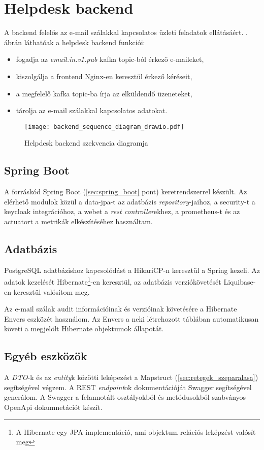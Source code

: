 \section{Helpdesk backend}
A backend felelős az e-mail szálakkal kapcsolatos üzleti feladatok ellátásáért. . ábrán láthatóak a helpdesk backend funkciói:
\begin{itemize}
	\item fogadja az \textit{email.in.v1.pub} kafka topic-ból érkező e-maileket, 
	\item kiszolgálja a frontend Nginx-en keresztül érkező kéréseit,
	\item a megfelelő kafka topic-ba írja az elküldendő üzeneteket,
	\item tárolja az e-mail szálakkal kapcsolatos adatokat.
\end{itemize}


\begin{figure}[hbt] 
	\centering
	\texttt{[image: backend\_sequence\_diagram\_drawio.pdf]}
	\caption{Helpdesk backend szekvencia diagramja}
	\label{fig:backend_sequence_diagram}
\end{figure}


\subsection{Spring Boot}
A forráskód Spring Boot (\ref{sec:spring_boot} pont) keretrendszerrel készült. Az elérhető modulok közül a data-jpa-t az adatbázis \textit{repository}-jaihoz, a security-t a keycloak integrációhoz, a webet a \textit{rest controller}ekhez, a prometheus-t és az actuatort a metrikák elkészítéséhez használtam.	


\subsection{Adatbázis}\label{sec:adatbazis}
PostgreSQL adatbázishoz kapcsolódást a HikariCP-n keresztül a Spring kezeli.
Az adatok kezelését Hibernate\footnote{A Hibernate egy JPA implementáció, ami objektum relációs leképzést valósít meg}-en keresztül, az adatbázis verziókövetését Liquibase-en keresztül valósítom meg. 

Az e-mail szálak audit információinak és verzióinak követésére a Hibernate Envers eszközét használom. Az Envers a neki létrehozott táblában automatikusan követi a megjelölt Hibernate objektumok állapotát.

\subsection{Egyéb eszközök}\label{sec:backend_egyeb_eszkozok}
A \textit{DTO}-k és az \textit{entity}k közötti leképezést a Mapstruct (\ref{sec:retegek_szeparalasa}) segítségével végzem. A REST \textit{endpoint}ok dokumentációját Swagger segítségével generálom. A Swagger a felannotált osztályokból és metódusokból szabványos OpenApi dokumnetációt készít.





